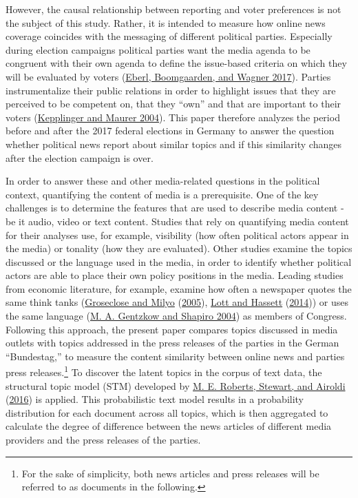 \documentclass[
]{article}
\begin{document}
However, the causal relationship between reporting and voter preferences
is not the subject of this study. Rather, it is intended to measure how
online news coverage coincides with the messaging of different political
parties. Especially during election campaigns political parties want the
media agenda to be congruent with their own agenda to define the
issue-based criteria on which they will be evaluated by voters
(\protect\hyperlink{ref-eberl_one_2017}{Eberl, Boomgaarden, and Wagner
2017}). Parties instrumentalize their public relations in order to
highlight issues that they are perceived to be competent on, that they
``own'' and that are important to their voters
(\protect\hyperlink{ref-kepplinger_einfluss_2004}{Kepplinger and Maurer
2004}). This paper therefore analyzes the period before and after the
2017 federal elections in Germany to answer the question whether
political news report about similar topics and if this similarity
changes after the election campaign is over.

In order to answer these and other media-related questions in the
political context, quantifying the content of media is a prerequisite.
One of the key challenges is to determine the features that are used to
describe media content - be it audio, video or text content. Studies
that rely on quantifying media content for their analyses use, for
example, visibility (how often political actors appear in the media) or
tonality (how they are evaluated). Other studies examine the topics
discussed or the language used in the media, in order to identify
whether political actors are able to place their own policy positions in
the media. Leading studies from economic literature, for example,
examine how often a newspaper quotes the same think tanks
(\protect\hyperlink{ref-groseclose_measure_2005}{Groseclose and Milyo}
(\protect\hyperlink{ref-groseclose_measure_2005}{2005}),
\protect\hyperlink{ref-lott_is_2014}{Lott and Hassett}
(\protect\hyperlink{ref-lott_is_2014}{2014})) or uses the same language
(\protect\hyperlink{ref-gentzkow_media_2004}{M. A. Gentzkow and Shapiro
2004}) as members of Congress. Following this approach, the present
paper compares topics discussed in media outlets with topics addressed
in the press releases of the parties in the German ``Bundestag,'' to
measure the content similarity between online news and parties press
releases.\footnote{For the sake of simplicity, both news articles and
  press releases will be referred to as documents in the following.} To
discover the latent topics in the corpus of text data, the structural
topic model (STM) developed by
\protect\hyperlink{ref-roberts_model_2016}{M. E. Roberts, Stewart, and
Airoldi} (\protect\hyperlink{ref-roberts_model_2016}{2016}) is applied.
This probabilistic text model results in a probability distribution for
each document across all topics, which is then aggregated to calculate
the degree of difference between the news articles of different media
providers and the press releases of the parties.
\end{document}
